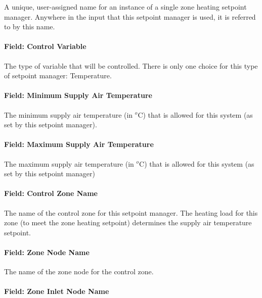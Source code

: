 A unique, user-assigned name for an instance of a single zone heating setpoint manager. Anywhere in the input that this setpoint manager is used, it is referred to by this name.

\paragraph{Field: Control Variable}\label{field-control-variable-4}

The type of variable that will be controlled. There is only one choice for this type of setpoint manager: Temperature.

\paragraph{Field: Minimum Supply Air Temperature}\label{field-minimum-supply-air-temperature-1}

The minimum supply air temperature (in \(^{o}\)C) that is allowed for this system (as set by this setpoint manager).

\paragraph{Field: Maximum Supply Air Temperature}\label{field-maximum-supply-air-temperature-1}

The maximum supply air temperature (in \(^{o}\)C) that is allowed for this system (as set by this setpoint manager)

\paragraph{Field: Control Zone Name}\label{field-control-zone-name-1}

The name of the control zone for this setpoint manager. The heating load for this zone (to meet the zone heating setpoint) determines the supply air temperature setpoint.

\paragraph{Field: Zone Node Name}\label{field-zone-node-name-1-000}

The name of the zone node for the control zone.

\paragraph{Field: Zone Inlet Node Name}\label{field-zone-inlet-node-name-1}

